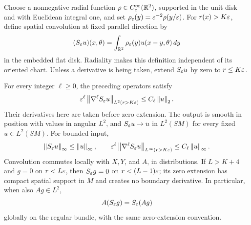 Choose a nonnegative radial function
\(\rho\in C_c^\infty(\mathbb R^2)\), supported in the unit disk and with
Euclidean integral one, and set
\(\rho_\varepsilon(y)=\varepsilon^{-2}\rho(y/\varepsilon)\). For \(r(x)>K\varepsilon\),
define spatial convolution at fixed parallel direction by
\begin{equation}\label{eq:smoothing-definition}
 (S_\varepsilon u)(x,\theta)
 =\int_{\mathbb R^2}\rho_\varepsilon(y)u(x-y,\theta)\,dy
\end{equation}
in the embedded flat disk. Radiality makes this definition independent
of its oriented chart. Unless a derivative is being taken, extend
\(S_\varepsilon u\) by zero to \(r\le K\varepsilon\).

\begin{lemma}\label{lem:smoothing}
For every integer \(\ell\ge0\), the preceding operators satisfy
\begin{equation}\label{eq:smoothing-bounds}
 \varepsilon^\ell\left\lVert\nabla^\ell S_\varepsilon u\right\rVert_{L^2(r>K\varepsilon)}
 \le C_\ell\left\lVert u\right\rVert_2.
\end{equation}
Their derivatives here are taken before zero extension. The output
is smooth in position with values in angular \(L^2\), and
\(S_\varepsilon u\to u\) in \(L^2(SM)\) for every fixed \(u\in L^2(SM)\).
For bounded input,
\[
 \left\lVert S_\varepsilon u\right\rVert_\infty\le\left\lVert u\right\rVert_\infty,
 \qquad
 \varepsilon^\ell\left\lVert\nabla^\ell S_\varepsilon u\right\rVert_{L^\infty(r>K\varepsilon)}
 \le C_\ell\left\lVert u\right\rVert_\infty.
\]
Convolution commutes locally with \(X,Y\), and \(A\), in
distributions. If \(L>K+4\) and \(g=0\) on \(r<L\varepsilon\), then
\(S_\varepsilon g=0\) on \(r<(L-1)\varepsilon\); its zero extension has compact
spatial support in \(M\) and creates no boundary derivative.
In particular, when also \(Ag\in L^2\),
\begin{equation}\label{eq:smoothing-commutes}
 A(S_\varepsilon g)=S_\varepsilon(Ag)
\end{equation}
globally on the regular bundle, with the same zero-extension convention.
\end{lemma}

